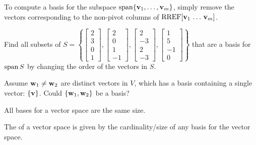 
\begin{applicationActivities}{3}{14}

\begin{fact}
  To compute a basis for the subspace \(\operatorname{span}\{\mathbf v_1,\dots,\mathbf v_m\}\),
  simply remove the vectors corresponding to the non-pivot columns of
  \(\operatorname{RREF}[\mathbf v_1\,\dots\,\mathbf v_m]\).
\end{fact}

\begin{activity}{10}
  Find all subsets of \(S=\left\{
  \begin{bmatrix}2\\3\\0\\1\end{bmatrix},
  \begin{bmatrix}2\\0\\1\\-1\end{bmatrix},
  \begin{bmatrix}2\\-3\\2\\-3\end{bmatrix},
  \begin{bmatrix}1\\5\\-1\\0\end{bmatrix}
  \right\}
  \) that are a basis for \(\operatorname{span} S\) by changing the order
  of the vectors in \(S\).
\end{activity}

\begin{activity}{10}
  Assume \(\mathbf w_1\not=\mathbf w_2\) are distinct vectors in \(V\),
  which has a basis containing a single vector: \(\{\mathbf v\}\).
  Could \(\{\mathbf w_1,\mathbf w_2\}\) be a basis?
\end{activity}

\begin{fact}
  All bases for a vector space are the same size.
\end{fact}

\begin{definition}
  The  of a vector space is given by the cardinality/size
  of any basis for the vector space.
\end{definition}


\end{applicationActivities}
